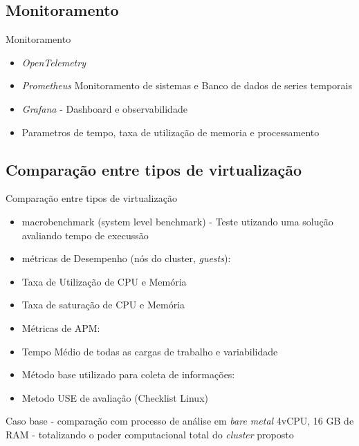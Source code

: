\documentclass[10pt,brazil]{beamer}
\theoremstyle{definition}
\begin{document}
\subsection{Monitoramento}

\begin{frame}{Monitoramento}
  \begin{itemize}
    \item \emph{OpenTelemetry}
    \item \emph{Prometheus} Monitoramento de sistemas e Banco de dados de series temporais
    \item \emph{Grafana} - Dashboard e observabilidade
    \item Parametros de tempo, taxa de utilização de memoria e processamento
  \end{itemize}
\end{frame}


\subsection{Comparação entre tipos de virtualização}

\begin{frame}[allowframebreaks]{Comparação entre tipos de virtualização}
  
  \begin{itemize}
      \item macrobenchmark (system level benchmark) - Teste utizando uma solução avaliando tempo de execussão
      \item[] métricas de Desempenho (nós do cluster, \emph{guests}):
      \item Taxa de Utilização de CPU e Memória 
      \item Taxa de saturação de CPU e Memória
      \item[] Métricas de APM:
      \item Tempo Médio de todas as cargas de trabalho e variabilidade
      \item[] Método base utilizado para coleta de informações:
      \item Metodo USE de avaliação (Checklist Linux)
  \end{itemize}
  
  Caso base - comparação com processo de análise em \emph{bare metal} 4vCPU, 16 GB de RAM - totalizando o poder computacional total do \emph{cluster} proposto
\end{frame}
\end{document}
